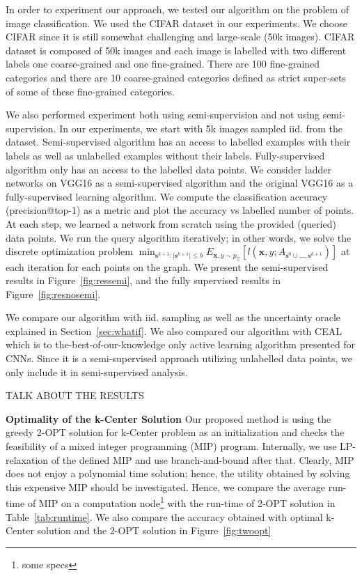 \documentclass{article}
\begin{document}
In order to experiment our approach, we tested our algorithm on the problem of image classification. We used the CIFAR\cite{cifar} dataset in our experiments. We choose CIFAR since it is still somewhat challenging and large-scale (50k images).  CIFAR\cite{cifar} dataset is composed of 50k images and each image is labelled with two different labels one coarse-grained and one fine-grained. There are 100 fine-grained categories and there are 10 coarse-grained categories defined as strict super-sets of some of these fine-grained categories. 

We also performed experiment both using semi-supervision and not using semi-supervision. In our experiments, we start with 5k images sampled iid. from the dataset. Semi-supervised algorithm has an access to labelled examples with their labels as well as unlabelled examples without their labels. Fully-supervised algorithm only has an access to the labelled data points. We consider ladder networks\cite{ladder} on VGG16\cite{vgg} as a semi-supervised algorithm and the original VGG16\cite{vgg} as a fully-supervised learning algorithm. We compute the classification accuracy (precision@top-1) as a metric and plot the accuracy vs labelled number of points. At each step, we learned a network from scratch using the provided (queried) data points. We run the query algorithm iteratively; in other words, we solve the discrete optimization problem $\min_{\mathbf{s}^{k+1} : |\mathbf{s}^{k+1}| \leq b} E_{\mathbf{x},y \sim p_\mathcal{Z}} [l(\mathbf{x},y; A_{\mathbf{s}^{0} \cup \ldots, \mathbf{s}^{k+1}})]$ at each iteration for each points on the graph. We present the semi-supervised results in Figure~\ref{fig:ressemi}, and the fully supervised results in Figure~\ref{fig:resnosemi}.

We compare our algorithm with iid. sampling as well as the uncertainty oracle explained in Section~\ref{sec:whatif}. We also compared our algorithm with CEAL \cite{wang2016cost} which is to the-best-of-our-knowledge only active learning algorithm presented for CNNs. Since it is a semi-supervised approach utilizing unlabelled data points, we only include it in semi-supervised analysis.

TALK ABOUT THE RESULTS

\noindent\textbf{Optimality of the k-Center Solution}
Our proposed method is using the greedy 2-OPT solution for k-Center problem as an initialization and checks the feasibility of a mixed integer programming (MIP) program. Internally, we use LP-relaxation of the defined MIP and use branch-and-bound after that. Clearly, MIP does not enjoy a polynomial time solution; hence, the utility obtained by solving this expensive MIP should be investigated. Hence, we compare the average run-time of MIP on a computation node\footnote{some specs} with the run-time of 2-OPT solution in Table~\ref{tab:runtime}. We also compare the accuracy obtained with optimal k-Center solution and the 2-OPT solution in Figure~\ref{fig:twoopt}
\end{document}
